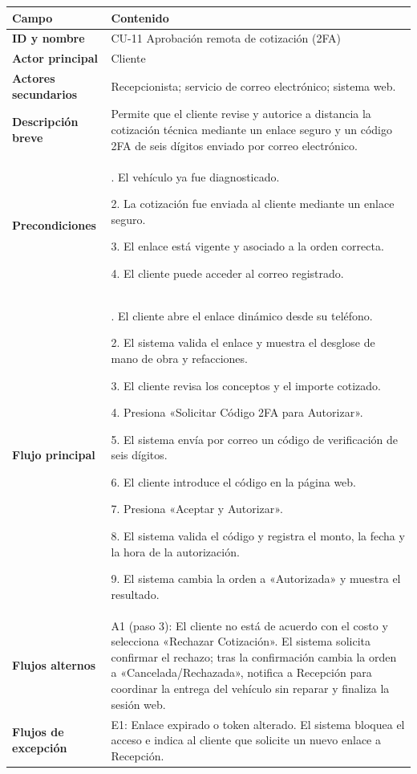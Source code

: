 {\def\LTcaptype{none} %
\begin{longtable}[]{@{}
  >{\raggedright\arraybackslash}p{}
  >{\raggedright\arraybackslash}p{}@{}}
\toprule\noalign{}
\begin{minipage}[b]{\linewidth}\raggedright
\textbf{Campo}
\end{minipage} & \begin{minipage}[b]{\linewidth}\raggedright
\textbf{Contenido}
\end{minipage} \\
\midrule\noalign{}
\endhead
\bottomrule\noalign{}
\endlastfoot
\textbf{ID y nombre} & CU-11 Aprobación remota de cotización (2FA) \\
\textbf{Actor principal} & Cliente \\
\textbf{Actores secundarios} & Recepcionista; servicio de correo
electrónico; sistema web. \\
\textbf{Descripción breve} & Permite que el cliente revise y autorice a
distancia la cotización técnica mediante un enlace seguro y un código
2FA de seis dígitos enviado por correo electrónico. \\
\textbf{Precondiciones} & 1. El vehículo ya fue diagnosticado.

2. La cotización fue enviada al cliente mediante un enlace seguro.

3. El enlace está vigente y asociado a la orden correcta.

4. El cliente puede acceder al correo registrado. \\
\textbf{Flujo principal} & 1. El cliente abre el enlace dinámico desde
su teléfono.

2. El sistema valida el enlace y muestra el desglose de mano de obra y
refacciones.

3. El cliente revisa los conceptos y el importe cotizado.

4. Presiona «Solicitar Código 2FA para Autorizar».

5. El sistema envía por correo un código de verificación de seis
dígitos.

6. El cliente introduce el código en la página web.

7. Presiona «Aceptar y Autorizar».

8. El sistema valida el código y registra el monto, la fecha y la hora
de la autorización.

9. El sistema cambia la orden a «Autorizada» y muestra el resultado. \\
\textbf{Flujos alternos} & A1 (paso 3): El cliente no está de acuerdo
con el costo y selecciona «Rechazar Cotización». El sistema solicita
confirmar el rechazo; tras la confirmación cambia la orden a
«Cancelada/Rechazada», notifica a Recepción para coordinar la entrega
del vehículo sin reparar y finaliza la sesión web. \\
\textbf{Flujos de excepción} & E1: Enlace expirado o token alterado. El
sistema bloquea el acceso e indica al cliente que solicite un nuevo
enlace a Recepción.


\end{longtable}}
